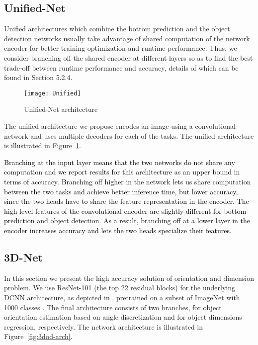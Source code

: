 \documentclass[10pt,twocolumn,letterpaper]{article}
\begin{document}
\subsection{Unified-Net} 

Unified architectures which combine the bottom prediction and the object detection networks usually take advantage of shared computation of the network encoder for better training optimization and runtime performance. Thus, we consider branching off the shared encoder at different layers so as to find the best trade-off between runtime performance and accuracy, details of which can be found in Section 5.2.4.

\begin{figure}[t]
\begin{center}
\texttt{[image: Unified]}
\end{center}
   \caption{Unified-Net architecture}
\label{fig:unified}
\end{figure}

The unified architecture we propose encodes an image using a convolutional network and uses multiple decoders for each of the tasks. The unified architecture is illustrated in Figure~\ref{fig:unified}.

\textcolor{black}{
Branching at the input layer means that the two networks do not share any computation and we report results for this architecture as an upper bound in terms of accuracy. Branching off higher in the network lets us share computation between the two tasks and achieve better inference time, but lower accuracy, since the two heads have to share the feature representation in the encoder. 
The high level features of the convolutional encoder are slightly different for bottom prediction and object detection. As a result, branching off at a lower layer in the encoder increases accuracy and lets the two heads specialize their features. }
\subsection{3D-Net} 

In this section we present the high accuracy solution of orientation and dimension problem. We use ResNet-101 \cite{DBLP:journals/corr/HeZRS15} (the top 22 residual blocks) for the underlying DCNN architecture, as depicted in \cite{Hara2017DesigningDC}, pretrained on a subset of ImageNet with 1000 classes \cite{ILSVRC15}. The final architecture consists of two branches, for object orientation estimation based on angle discretization and for object dimensions regression, respectively. The network architecture is illustrated in Figure~\ref{fig:3dod-arch}.
\end{document}
